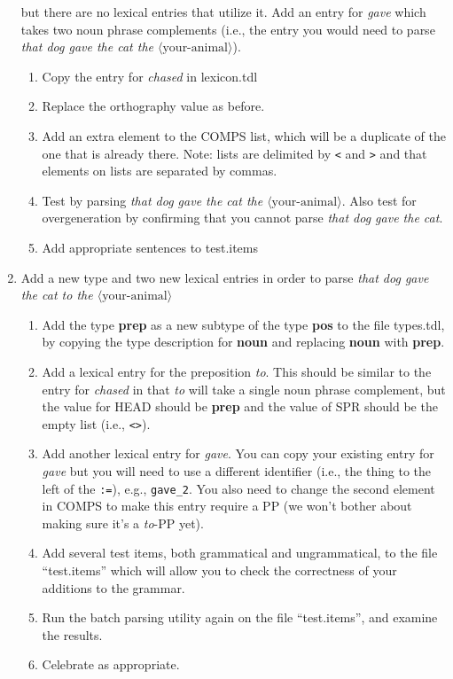 \documentclass[10pt]{article}
\begin{document}
\begin{enumerate}
but there are no lexical entries that utilize it.  Add an entry for {\it gave} which takes two noun phrase
complements (i.e., the entry you would need to parse {\it that dog gave the cat the $\langle\mbox{your-animal}\rangle$}). 
\begin{enumerate}
\item Copy the entry for {\it chased} in lexicon.tdl
\item Replace the orthography value as before.
\item Add an extra element to the COMPS list, which will be a duplicate of the
one that is already there.  Note: lists are delimited by
{\tt <} and {\tt >} and that elements on lists are
separated by commas.
\item Test by parsing {\it that dog gave the cat the $\langle\mbox{your-animal}\rangle$}.  Also test for overgeneration by confirming that you cannot
parse {\it that dog gave the cat}.  
\item Add appropriate sentences to test.items
\end{enumerate}
\item Add a new type and two new lexical entries 
in order to parse
{\it that dog gave the cat to the $\langle\mbox{your-animal}\rangle$}
\begin{enumerate}
\item Add the type {\bf prep} as
a new subtype of the type {\bf pos} to the file types.tdl, by copying 
the type description for {\bf noun} and replacing {\bf noun} with {\bf prep}. 
\item Add a lexical entry for the preposition {\it to}.  This should be similar
to the entry for {\it chased} in that {\it to} will take a single noun
phrase complement, but the value for HEAD should be {\bf prep} and the
value of SPR should be the empty list (i.e., {\tt <>}).
\item Add another lexical entry for {\it gave}.  You can copy your existing entry for {\it gave} but
you will need to use
a different identifier (i.e., the thing to the left of the \verb!:=!), e.g., 
\verb!gave_2!.  You also need to change the second element in
COMPS to make this entry require a PP (we won't bother about
making sure it's a {\it to}-PP yet).
\item Add several test items, both grammatical and ungrammatical,
to the file ``test.items'' which will allow you to check the
correctness of your additions to the grammar.   
\item Run the batch parsing utility again on the file ``test.items'', and
examine the results.
\item Celebrate as appropriate.
 \end{enumerate}\end{enumerate}
\end{document}
